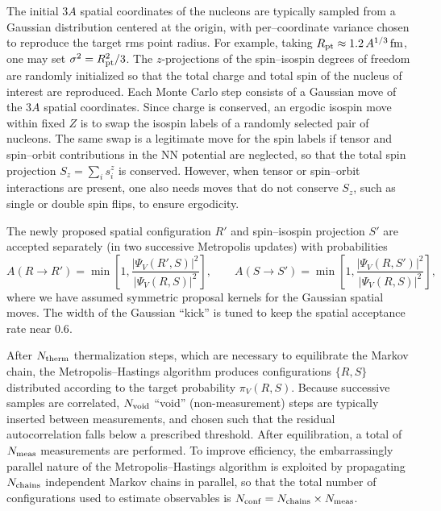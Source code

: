 The initial $3A$ spatial coordinates of the nucleons are typically sampled from a Gaussian distribution centered at the origin, with per–coordinate variance chosen to reproduce the target rms point radius. For example, taking $R_{\rm pt}\approx 1.2\,A^{1/3}\,\mathrm{fm}$, one may set $\sigma^2 = R_{\rm pt}^2/3$. The $z$-projections of the spin–isospin degrees of freedom are randomly initialized so that the total charge and total spin of the nucleus of interest are reproduced. Each Monte Carlo step consists of a Gaussian move of the $3A$ spatial coordinates. Since charge is conserved, an ergodic isospin move within fixed $Z$ is to swap the isospin labels of a randomly selected pair of nucleons. The same swap is a legitimate move for the spin labels if tensor and spin–orbit contributions in the NN potential are neglected, so that the total spin projection $S_z=\sum_i s_i^z$ is conserved. However, when tensor or spin–orbit interactions are present, one also needs moves that do not conserve $S_z$, such as single or double spin flips, to ensure ergodicity.

The newly proposed spatial configuration $R'$ and spin–isospin projection $S'$ are accepted separately (in two successive Metropolis updates) with probabilities
\begin{equation}
A(R\!\to\! R')=\min\!\left[1,\frac{|\Psi_V(R',S)|^2}{|\Psi_V(R,S)|^2}\right],\qquad
A(S\!\to\! S')=\min\!\left[1,\frac{|\Psi_V(R,S')|^2}{|\Psi_V(R,S)|^2}\right],
\end{equation}
where we have assumed symmetric proposal kernels for the Gaussian spatial moves. The width of the Gaussian ``kick'' is tuned to keep the spatial acceptance rate near $0.6$.

After $N_{\rm therm}$ thermalization steps, which are necessary to equilibrate the Markov chain, the Metropolis–Hastings algorithm produces configurations $\{R,S\}$ distributed according to the target probability $\pi_V(R,S)$. Because successive samples are correlated, $N_{\rm void}$ ``void'' (non-measurement) steps are typically inserted between measurements, and chosen such that the residual autocorrelation falls below a prescribed threshold. After equilibration, a total of $N_{\rm meas}$ measurements are performed. To improve efficiency, the embarrassingly parallel nature of the Metropolis–Hastings algorithm is exploited by propagating $N_{\rm chains}$ independent Markov chains in parallel, so that the total number of configurations used to estimate observables is
$N_{\rm conf}=N_{\rm chains}\times N_{\rm meas}$.


